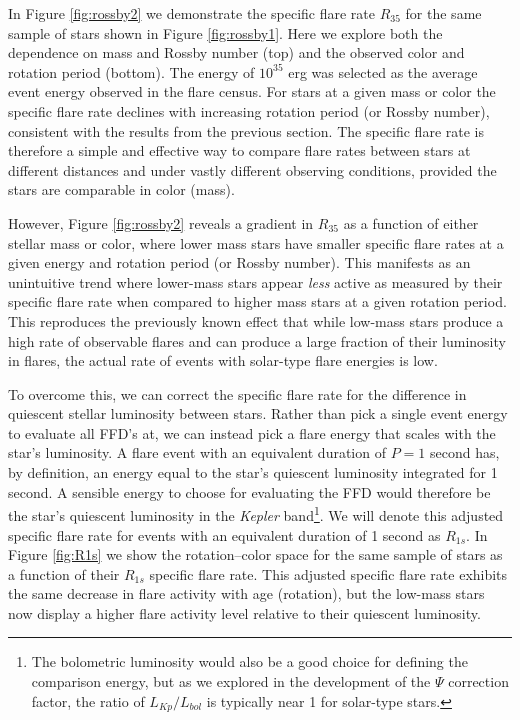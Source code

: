 \documentclass[preprint2]{aastex62}
\newcommand{\Kepler}{\textsl{Kepler}\xspace}
\begin{document}
In Figure \ref{fig:rossby2} we demonstrate the specific flare rate $R_{35}$ for the same sample of stars shown in Figure \ref{fig:rossby1}. Here we explore both the dependence on mass and Rossby number (top) and the observed color and rotation period (bottom). The energy of $10^{35}$ erg was selected as the average event energy observed in the \citet{davenport2016} flare census. For stars at a given mass or color the specific flare rate declines with increasing rotation period (or Rossby number), consistent with the results from the previous section. The specific flare rate is therefore a simple and effective way to compare flare rates between stars at different distances and under vastly different observing conditions, provided the stars are comparable in color (mass).


However, Figure \ref{fig:rossby2} reveals a gradient in $R_{35}$ as a function of either stellar mass or color, where lower mass stars have smaller specific flare rates at a given energy and rotation period (or Rossby number).
This manifests as an unintuitive trend where lower-mass stars appear {\it less} active as measured by their specific flare rate when compared to higher mass stars at a given rotation period.
This reproduces the previously known effect that while low-mass stars produce a high rate of observable flares and can produce a large fraction of their luminosity in flares, the actual rate of events with solar-type flare energies is low. 



To overcome this, we can correct the specific flare rate for the difference in quiescent stellar luminosity between stars. Rather than pick a single event energy to evaluate all FFD's at, we can instead pick a flare energy that scales with the star's luminosity. A flare event with an equivalent duration of $P=1$ second has, by definition, an energy equal to the star's quiescent luminosity integrated for 1 second. A sensible energy to choose for evaluating the FFD would therefore be the star's quiescent luminosity in the \Kepler band\footnote{The bolometric luminosity would also be a good choice for defining the comparison energy, but as we explored in the development of the $\Psi$ correction factor, the ratio of $L_{Kp}/L_{bol}$ is typically near 1 for solar-type stars.}. We will denote this adjusted specific flare rate for events with an equivalent duration of 1 second as $R_{1s}$. In Figure \ref{fig:R1s} we show the rotation--color space for the same sample of stars as a function of their $R_{1s}$ specific flare rate. This adjusted specific flare rate exhibits the same decrease in flare activity with age (rotation), but the low-mass stars now display a higher flare activity level relative to their quiescent luminosity.
\end{document}
